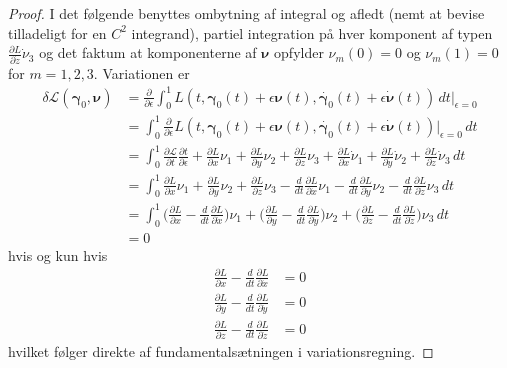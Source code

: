 \begin{proof} I det følgende benyttes ombytning af integral og afledt (nemt at bevise tilladeligt for en $C^2$ integrand), partiel integration på hver komponent af typen $\frac{\partial L}{\partial \dot{z}} \dot{\nu}_3$ og det faktum at komponenterne af $ {\boldsymbol \nu}$ opfylder $\nu_m(0)=0$ og $\nu_m(1)=0$ for $m=1,2,3$. Variationen er
\begin{align*}
\delta \mathscr{L}({\boldsymbol \gamma}_0, {\boldsymbol \nu}) &= \frac{\partial}{\partial \epsilon} \int_0^1  L(t, {\boldsymbol \gamma}_0(t)+\epsilon {\boldsymbol \nu}(t),\dot{{\boldsymbol \gamma}_0}(t)+\epsilon \dot{{\boldsymbol \nu}}(t)) \, dt \Big|_{\epsilon = 0} \\
&=
\int_0^1\frac{\partial}{\partial \epsilon}  L(t, {\boldsymbol \gamma}_0(t)+\epsilon {\boldsymbol \nu}(t),\dot{{\boldsymbol \gamma}_0}(t)+\epsilon \dot{{\boldsymbol \nu}}(t))\Big|_{\epsilon = 0} \, dt \\
&=
\int_0^1 \frac{\partial  \mathcal{ L}}{\partial t} \frac{\partial t}{\partial \epsilon} + \frac{\partial L}{\partial x} \nu_1 + \frac{\partial L}{\partial y} \nu_2 + \frac{\partial L}{\partial z} \nu_3 + \frac{\partial L}{\partial \dot{x}} \dot{\nu}_1 + \frac{\partial L}{\partial \dot{y}} \dot{\nu}_2 + \frac{\partial L}{\partial \dot{z}} \dot{\nu}_3 \, dt \\
&=
\int_0^1  \frac{\partial L}{\partial x} \nu_1 + \frac{\partial L}{\partial y} \nu_2 + \frac{\partial L}{\partial z} \nu_3 -\frac{d}{dt}\frac{\partial L}{\partial \dot{x}} \nu_1 -\frac{d}{dt} \frac{\partial L}{\partial \dot{y}} \nu_2 -\frac{d}{dt} \frac{\partial L}{\partial \dot{z}} \nu_3 \, dt \\
&=
\int_0^1 \Big( \frac{\partial L}{\partial x} -\frac{d}{dt}\frac{\partial L}{\partial \dot{x}} \Big) \nu_1  + \Big( \frac{\partial L}{\partial y} -\frac{d}{dt} \frac{\partial L}{\partial \dot{y}} \Big) \nu_2  +
\Big( \frac{\partial L}{\partial z} -\frac{d}{dt} \frac{\partial L}{\partial \dot{z}} \Big) \nu_3 \, dt \\
&=0
\end{align*}
hvis og kun hvis 
\begin{align*}
\frac{\partial L}{\partial x} -\frac{d}{dt}\frac{\partial L}{\partial \dot{x}} &= 0 \\
\frac{\partial L}{\partial y} -\frac{d}{dt} \frac{\partial L}{\partial \dot{y}} &=0 \\
\frac{\partial L}{\partial z} -\frac{d}{dt} \frac{\partial L}{\partial \dot{z}} &=0
\end{align*}
hvilket følger direkte af fundamentalsætningen i variationsregning.
\end{proof}
